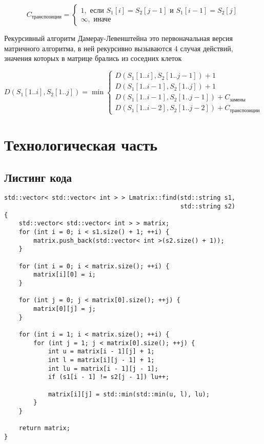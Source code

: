 ﻿\documentclass[a4paper,12pt]{article}
\begin{document}
    $$
    C_\text{транспозиции} = 
    \begin{cases}
        1, \text{ если } S_1[i] = S_2[j - 1] \text{ и } S_1[i-1] = S_2[j] \\
        \infty, \text{ иначе}
    \end{cases}
    $$

    Рекурсивный алгоритм Дамерау-Левенштейна это первоначальная версия матричного алгоритма, в ней рекурсивно вызываются 4 случая действий, значения которых в матрице брались из соседних клеток

    $$
    D(S_1[1..i], S_2[1..j]) = \min 
    \begin{cases}
        D(S_1[1..i], S_2[1..j-1]) + 1 \\
        D(S_1[1..i-1], S_2[1..j]) + 1 \\
        D(S_1[1..i-1], S_2[1..j-1]) + C_\text{замены} \\
        D(S_1[1..i-2], S_2[1..j-2]) + C_\text{транспозиции}
    \end{cases}
    $$

    \newpage
    \section{Технологическая часть}
    \subsection{Листинг кода}

    \begin{lstlisting}[caption=Левенштейна матричный]
std::vector< std::vector< int > > Lmatrix::find(std::string s1,
                                                std::string s2)
{
    std::vector< std::vector< int > > matrix;
    for (int i = 0; i < s1.size() + 1; ++i) {
        matrix.push_back(std::vector< int >(s2.size() + 1));
    }

    for (int i = 0; i < matrix.size(); ++i) {
        matrix[i][0] = i;
    }

    for (int j = 0; j < matrix[0].size(); ++j) {
        matrix[0][j] = j;
    }

    for (int i = 1; i < matrix.size(); ++i) {
        for (int j = 1; j < matrix[0].size(); ++j) {
            int u = matrix[i - 1][j] + 1;
            int l = matrix[i][j - 1] + 1;
            int lu = matrix[i - 1][j - 1];
            if (s1[i - 1] != s2[j - 1]) lu++;

            matrix[i][j] = std::min(std::min(u, l), lu);
        }
    }

    return matrix;
}
    \end{lstlisting}
\end{document}
